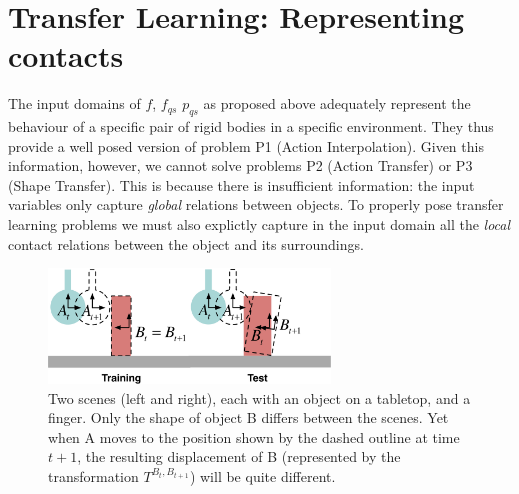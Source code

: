 \section{Transfer Learning: Representing contacts}
\label{sec:InfoForPrediction}

The input domains of $f$, $f_{qs}$ $p_{qs}$ as proposed above  adequately represent the behaviour of a specific pair of rigid bodies in a specific environment. They thus provide a well posed version of problem P1 (Action Interpolation). Given this information, however, we cannot solve problems P2 (Action Transfer) or P3 (Shape Transfer). This is because there is insufficient information: the input variables only capture {\em global} relations between objects. To properly pose transfer learning problems we must also explictly capture in the input domain all the {\em local} contact relations between the object and its surroundings. 


\begin{figure}[t]
\centerline{\includegraphics[width=7.5cm]{shapes-colour}}
\caption[Shapes]{Two scenes (left and right),
each with an object on a tabletop, and a finger.
Only the shape of object B differs between the scenes.
Yet when A moves to the position shown by the dashed outline at time $t+1$,
the resulting displacement of B
(represented by the transformation $T^{B_{t}, B_{t+1}}$)
will be quite different.}
\label{fig:Learning.shapes}
\end{figure}

